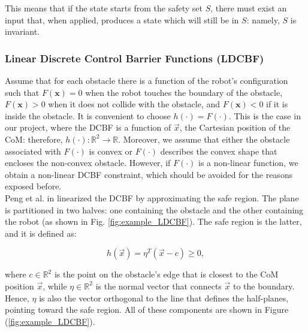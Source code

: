 This means that if the state starts from the safety set $S$, there must exist an input that, when applied, produces a state which will still be in $S$: namely, $S$ is invariant.

\subsubsection{Linear Discrete Control Barrier Functions (LDCBF)}\label{subsec:ldcbf}
Assume that for each obstacle there is a function of the robot's configuration such that $F(\mathbf{x})=0$ when the robot touches the boundary of the obstacle, $F(\mathbf{x})>0$ when it does not collide with the obstacle, and $F(\mathbf{x})<0$ if it is inside the obstacle. It is convenient to choose $h(\cdot)=F(\cdot)$. This is the case in our project, where the DCBF is a function of $\vec{x}$, the Cartesian position of the CoM: therefore, $h(\cdot)\colon \mathbb{R}^2 \rightarrow \mathbb{R}$. Moreover, we assume that either the obstacle associated with $F(\cdot)$ is convex or $F(\cdot)$ describes the convex shape that encloses the non-convex obstacle.
However, if $F(\cdot)$ is a non-linear function, we obtain a non-linear DCBF constraint, which should be avoided for the reasons exposed before.\\
Peng et al. in \cite{peng_main_paper} linearized the DCBF by approximating the safe region. The plane is partitioned in two halves: one containing the obstacle and the other containing the robot (as shown in Fig. \ref{fig:example_LDCBF}).
The safe region is the latter, and it is defined as:

\begin{equation} \label{eq:std_ldcbf_def}
h\left(\vec{x}\right) = \eta^T \left(\vec{x} - c\right) \geq 0,
\end{equation}

where $c \in \mathbb{R}^2$ is the point on the obstacle's edge that is closest to the CoM position $\vec{x}$, while $\eta \in \mathbb{R}^2$ is the normal vector that connects $\vec{x}$ to the boundary. Hence, $\eta$ is also the vector orthogonal to the line that defines the half-planes, pointing toward the safe region. All of these components are shown in Figure (\ref{fig:example_LDCBF}).\\


